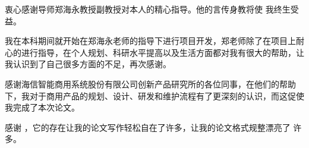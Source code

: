 \begin{acknowledgement}
  衷心感谢导师郑海永教授副教授对本人的精心指导。他的言传身教将使
  我终生受益。

  我在本科期间就开始在郑海永老师的指导下进行项目开发，郑老师除了在项目上耐心的进行指导，在个人规划、科研水平提高以及生活方面都对我有很大的帮助，让我认识到了自己很多方面的不足，再次感谢。



  感谢海信智能商用系统股份有限公司创新产品研究所的各位同事，在他们的帮助下，我对于商用产品的规划、设计、研发和维护流程有了更深刻的认识，而这促使我完成了本次论文。

  感谢 \thuthesis，它的存在让我的论文写作轻松自在了许多，让我的论文格式规整漂亮了
  许多。
\end{acknowledgement}
